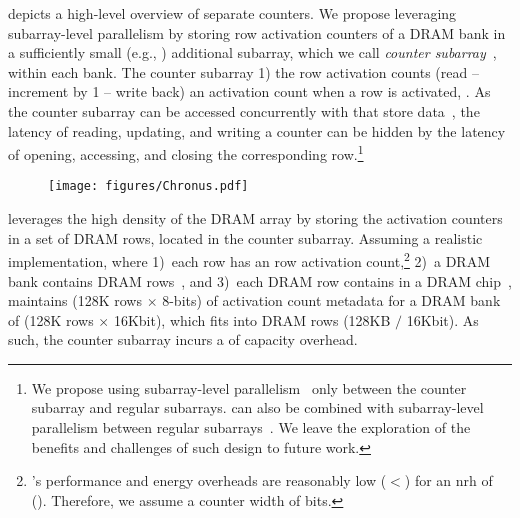  depicts a high-level overview of  separate counters.
We propose leveraging subarray-level parallelism by storing row activation counters of a DRAM bank in a sufficiently small (e.g., ) additional subarray, which we call  \emph{counter subarray}~, within each bank.
The counter subarray 1)  the row activation counts   (read -- increment by 1 -- write back) an activation count when a row is activated, .
As the counter subarray can be accessed concurrently with  that store data~\cite{kim2012acase, chang2014improving, yaglikci2022hira, yuksel2024functionally, yuksel2024simultaneous}, the latency of reading, updating, and writing a counter can be hidden by the latency of opening, accessing, and closing the corresponding row.\footnote{We propose using subarray-level parallelism~\cite{kim2012acase} only between the counter subarray and regular subarrays. \X{} can also be combined with  subarray-level parallelism between regular subarrays~\cite{kim2012acase}. We leave the exploration of the benefits and challenges of such design to future work.}

\begin{figure}[h]
\centering
\texttt{[image: figures/Chronus.pdf]}
\caption{}
\label{fig:chronushighlevel}
\end{figure}
\addtocounter{figure}{1}

\X{} leverages the high density of the DRAM array by storing the activation counters in a set of DRAM rows, located in the counter subarray.
Assuming a realistic implementation, where
1)~each row has an  row activation count,\footnote{\X{}'s performance and energy overheads are reasonably low ($<$) for an \gls{nrh} of  (). Therefore, we assume a counter width of  bits.}
2)~a DRAM bank contains  DRAM rows~\cite{jedec2024jesd795c}, and
3)~each DRAM row contains  in a DRAM chip~\cite{jedec2024jesd795c},
\X{} maintains  (128K rows $\times$ 8-bits) of activation count metadata for a DRAM bank of  (128K rows $\times$ 16Kbit), which fits into  DRAM rows (128KB $/$ 16Kbit).
As such, the counter subarray incurs  a  of capacity overhead.

